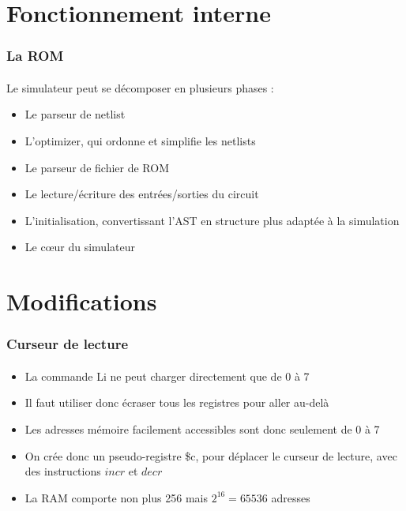 \documentclass{beamer}
\begin{document}
\section{Fonctionnement interne}

\begin{frame}
\frametitle{La ROM}
\paragraph{}Le simulateur peut se décomposer en plusieurs phases :
\begin{itemize}
	\item Le parseur de netlist
	\item L'optimizer, qui ordonne et simplifie les netlists
	\item Le parseur de fichier de ROM
	\item Le lecture/écriture des entrées/sorties du circuit
	\item L'initialisation, convertissant l'AST en structure plus adaptée à la simulation
	\item Le cœur du simulateur
\end{itemize}
\end{frame}   



\section{Modifications}


\begin{frame}
\frametitle{Curseur de lecture}
\paragraph{}
\begin{itemize}
	\item La commande Li ne peut charger directement que de 0 à 7
	\item Il faut utiliser donc écraser tous les registres pour aller au-delà
	\item Les adresses mémoire facilement accessibles sont donc seulement de 0 à 7
	\item On crée donc un pseudo-registre \$c, pour déplacer le curseur de lecture, avec des instructions $incr$ et $decr$
	\item La RAM comporte non plus 256 mais $2^{16} = 65536$ adresses
	\end{itemize}
	\end{frame} 
	
\end{document}
